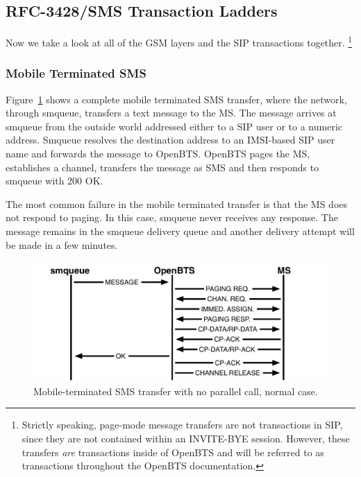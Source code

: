\documentclass[11pt,openany]{book}
\begin{document}
\subsection{RFC-3428/SMS Transaction Ladders}
Now we take a look at all of the GSM layers and the SIP transactions together.%
\footnote{Strictly speaking, page-mode message transfers are not transactions in SIP, since they are not contained within an INVITE-BYE session.  However, these transfers \emph{are} transactions inside of OpenBTS and will be referred to as transactions throughout the OpenBTS documentation.}

\subsubsection{Mobile Terminated SMS}
Figure~\ref{fig:MTSMSLadder} shows a complete mobile terminated SMS transfer, where the network, through smqueue, transfers a text message to the MS.  The message arrives at smqueue from the outside world addressed either to a SIP user or to a numeric address.  Smqueue resolves the destination address to an IMSI-based SIP user name and forwards the message to OpenBTS.  OpenBTS pages the MS, establishes a channel, transfers the message as SMS and then responds to smqueue with 200 OK.

The most common failure in the mobile terminated transfer is that the MS does not respond to paging.  In this case, smqueue never receives any response.  The message remains in the smqueue delivery queue and another delivery attempt will be made in a few minutes.

\begin{figure}[htbp]
\begin{center}
\includegraphics[width=6in]{MTSMSLadder.pdf}
\caption{Mobile-terminated SMS transfer with no parallel call, normal case.}
\label{fig:MTSMSLadder}
\end{center}
\end{figure}
\end{document}
